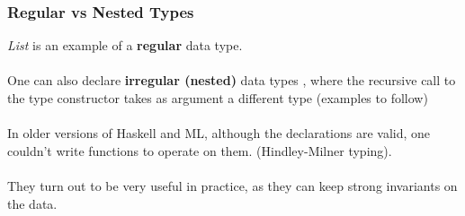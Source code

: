\documentclass{beamer}
\begin{document}
\begin{frame} 
\frametitle{Regular vs Nested Types} 


\textit{List} is an example of a \textbf{regular} data type. \\~\\
One can also declare \textbf{irregular (nested)} data types \cite{nested}, where the recursive call to the type constructor takes as argument a different type (examples to follow)\\~\\

In older versions of Haskell and ML, although the declarations are valid, one couldn't write functions to operate on them. \cite{nested} (Hindley-Milner typing).\\~\\
They turn out to be very useful in practice, as they can keep strong invariants on the data. \\ 
\end{frame} 
\end{document}
